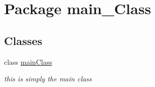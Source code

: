 \hypertarget{namespacemain___class}{}\section{Package main\+\_\+\+Class}
\label{namespacemain___class}
\subsection*{Classes}
\begin{DoxyCompactItemize}
\item 
class \hyperlink{classmain___class_1_1main_class}{main\+Class}
\begin{DoxyCompactList}\small\item\em this is simply the main class \end{DoxyCompactList}\end{DoxyCompactItemize}
